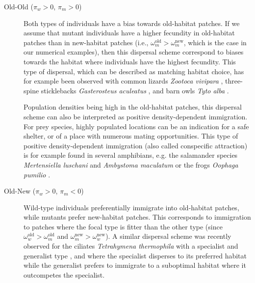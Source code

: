 \documentclass[11pt]{article}
\begin{document}
\begin{description}
	\item[Old-Old ($\pi_w>0$, $\pi_m>0$)] Both types of individuals have a bias towards old-habitat patches. If we assume that mutant individuals have a higher fecundity in old-habitat patches than in new-habitat patches (i.e., $\omega_m^{\text{old}} > \omega_m^{\text{new}}$, which is the case in our numerical examples), then this dispersal scheme correspond to biases towards the habitat where individuals have the highest fecundity. This type of dispersal, which can be described as matching habitat choice, has for example been observed with common lizards \textit{Zootoca vivipara} \citep{bestion_2015}, three-spine sticklebacks \textit{Gasterosteus aculeatus} \citep{bolnick_2009}, and barn owls \textit{Tyto alba} \citep{dreiss_2011}. 
	
	Population densities being high in the old-habitat patches, this dispersal scheme can also be interpreted as positive density-dependent immigration. For prey species, highly populated locations can be an indication for a safe shelter, or of a place with numerous mating opportunities. This type of positive density-dependent immigration (also called conspecific attraction) is for example found in several amphibians, e.g. the salamander species \textit{Mertensiella luschani} \citep{gautier_2006} and \textit{Ambystoma maculatum} \citep{greene_2016} or the frogs \textit{Oophaga pumilio} \citep{folt_2018}.
	
	\item[Old-New ($\pi_w>0$, $\pi_m<0$)] Wild-type individuals preferentially immigrate into old-habitat patches, while mutants prefer new-habitat patches. This corresponds to immigration to patches where the focal type is fitter than the other type (since $\omega_w^{\text{old}} >\omega_m^{\text{old}}$ and $\omega_m^{\text{new}} >\omega_w^{\text{new}}$). 
	A similar dispersal scheme was recently observed for the ciliates \textit{Tetrahymena thermophila} with a specialist and generalist type \citep{jacob_2018}, and where the specialist disperses to its preferred habitat while the generalist prefers to immigrate to a suboptimal habitat where it outcompetes the specialist. 
	

\end{description}
\end{document}
